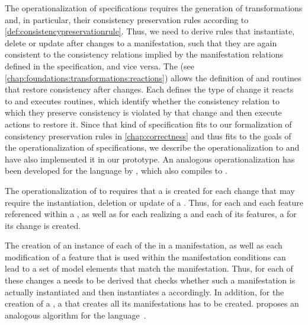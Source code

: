 The operationalization of \commonalities specifications requires the generation of transformations and, in particular, their consistency preservation rules according to \autoref{def:consistencypreservationrule}.
Thus, we need to derive rules that instantiate, delete or update \commonalities after changes to a manifestation, such that they are again consistent to the consistency relations implied by the manifestation relations defined in the \commonalities specification, and vice versa.
The \reactionslanguage (see \autoref{chap:foundations:transformations:reactions}) allows the definition of \reactions and routines that restore consistency after changes.
Each \reaction defines the type of change it reacts to and executes routines, which identify whether the consistency relation to which they preserve consistency is violated by that change and then execute actions to restore it.
Since that kind of specification fits to our formalization of consistency preservation rules in \autoref{chap:correctness} and thus fits to the goals of the operationalization of \commonalities specifications, we describe the operationalization to \reactions and have also implemented it in our prototype.
An analogous operationalization has been developed for the \mappings language by \textcite[Sec. 7.7]{kramer2017a}, which also compiles to \reactions.

The operationalization of \commonalities to \reactions requires that a \reaction is created for each change that may require the instantiation, deletion or update of a \commonality.
Thus, for each \metaclass and each feature referenced within a \commonality, as well as for each \metaclass realizing a \commonality and each of its features, a \reaction for its change is created.

The creation of an instance of each of the \metaclasses in a manifestation, as well as each modification of a feature that is used within the manifestation conditions can lead to a set of model elements that match the manifestation.
Thus, for each of these changes a \reaction needs to be derived that checks whether such a manifestation is actually instantiated and then instantiates a \commonality accordingly.
In addition, for the creation of a \commonality, a \reaction that creates all its manifestations has to be created.
\citeauthor{kramer2017a} proposes an analogous algorithm for the \mappings language~\cite[Alg. 1]{kramer2017a}.

